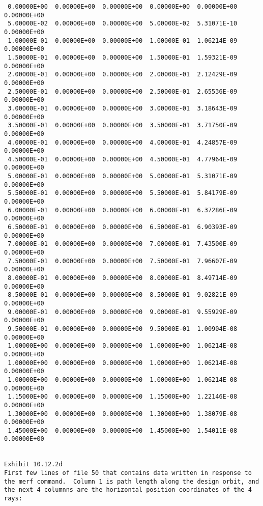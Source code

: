 \begin{footnotesize}
\begin{verbatim}
 0.00000E+00  0.00000E+00  0.00000E+00  0.00000E+00  0.00000E+00  0.00000E+00
 5.00000E-02  0.00000E+00  0.00000E+00  5.00000E-02  5.31071E-10  0.00000E+00
 1.00000E-01  0.00000E+00  0.00000E+00  1.00000E-01  1.06214E-09  0.00000E+00
 1.50000E-01  0.00000E+00  0.00000E+00  1.50000E-01  1.59321E-09  0.00000E+00
 2.00000E-01  0.00000E+00  0.00000E+00  2.00000E-01  2.12429E-09  0.00000E+00
 2.50000E-01  0.00000E+00  0.00000E+00  2.50000E-01  2.65536E-09  0.00000E+00
 3.00000E-01  0.00000E+00  0.00000E+00  3.00000E-01  3.18643E-09  0.00000E+00
 3.50000E-01  0.00000E+00  0.00000E+00  3.50000E-01  3.71750E-09  0.00000E+00
 4.00000E-01  0.00000E+00  0.00000E+00  4.00000E-01  4.24857E-09  0.00000E+00
 4.50000E-01  0.00000E+00  0.00000E+00  4.50000E-01  4.77964E-09  0.00000E+00
 5.00000E-01  0.00000E+00  0.00000E+00  5.00000E-01  5.31071E-09  0.00000E+00
 5.50000E-01  0.00000E+00  0.00000E+00  5.50000E-01  5.84179E-09  0.00000E+00
 6.00000E-01  0.00000E+00  0.00000E+00  6.00000E-01  6.37286E-09  0.00000E+00
 6.50000E-01  0.00000E+00  0.00000E+00  6.50000E-01  6.90393E-09  0.00000E+00
 7.00000E-01  0.00000E+00  0.00000E+00  7.00000E-01  7.43500E-09  0.00000E+00
 7.50000E-01  0.00000E+00  0.00000E+00  7.50000E-01  7.96607E-09  0.00000E+00
 8.00000E-01  0.00000E+00  0.00000E+00  8.00000E-01  8.49714E-09  0.00000E+00
 8.50000E-01  0.00000E+00  0.00000E+00  8.50000E-01  9.02821E-09  0.00000E+00
 9.00000E-01  0.00000E+00  0.00000E+00  9.00000E-01  9.55929E-09  0.00000E+00
 9.50000E-01  0.00000E+00  0.00000E+00  9.50000E-01  1.00904E-08  0.00000E+00
 1.00000E+00  0.00000E+00  0.00000E+00  1.00000E+00  1.06214E-08  0.00000E+00
 1.00000E+00  0.00000E+00  0.00000E+00  1.00000E+00  1.06214E-08  0.00000E+00
 1.00000E+00  0.00000E+00  0.00000E+00  1.00000E+00  1.06214E-08  0.00000E+00
 1.15000E+00  0.00000E+00  0.00000E+00  1.15000E+00  1.22146E-08  0.00000E+00
 1.30000E+00  0.00000E+00  0.00000E+00  1.30000E+00  1.38079E-08  0.00000E+00
 1.45000E+00  0.00000E+00  0.00000E+00  1.45000E+00  1.54011E-08  0.00000E+00


Exhibit 10.12.2d
First few lines of file 50 that contains data written in response to
the merf command.  Column 1 is path length along the design orbit, and
the next 4 columnns are the horizontal position coordinates of the 4 rays:


\end{verbatim}
\end{footnotesize}
